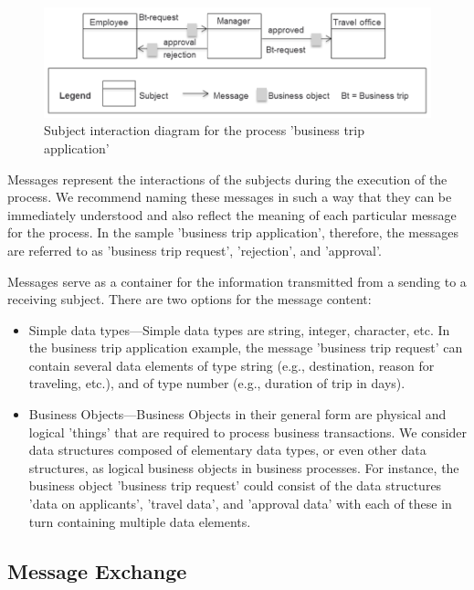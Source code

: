\begin{figure}[htbp]
	\centering
	\includegraphics[width=14cm]{20181026-Ontologie-Bilder/Grafiken-Ontologie/SUbject-Interaction/Beispiel-Subject-Interaction}
	\caption[Subject interaction diagram]{Subject interaction diagram for the process 'business trip application'}
	\label{fig:beispiel-subject-interaction}
\end{figure}

Messages represent the interactions of the subjects during the execution of the process. We recommend naming these messages in such a way that they can be immediately understood and also reflect the meaning of each particular message for the process. In the sample 'business trip application', therefore, the messages are referred to as 'business trip request', 'rejection', and 'approval'.

Messages serve as a container for the information transmitted from a sending to a receiving subject. There are two options for the message content:

\begin{itemize}
	\item 	Simple data types---Simple data types are string, integer, character, etc. In the business trip application example, the message 'business trip request' can contain several data elements of type string (e.g., destination, reason for traveling, etc.), and of type number (e.g., duration of trip in days).
	\item Business Objects---Business Objects in their general form are physical and logical 'things' that are required to process business transactions. We consider data structures composed of elementary data types, or even other data structures, as logical business objects in business processes. For instance, the business object 'business trip request' could consist of the data structures 'data on applicants', 'travel data', and 'approval data' with each of these in turn containing multiple data elements.
\end{itemize}

\subsection{Message Exchange}

